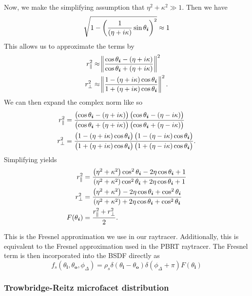 \documentclass[12pt]{article}
\begin{document}
Now, we make the simplifying assumption that \(\eta^2 + \kappa^2 \gg 1\). Then we have
\[\sqrt{1 - \del{\frac{1}{\del{\eta + i\kappa}}\sin \theta_{\bm i}}^2} \approx 1\]
This allows us to approximate the terms by
\begin{align*}
  r_{\parallel}^2 &\approx \norm{\frac{\cos \theta_{\bm i} - \del{\eta + i\kappa}}{\cos \theta_{\bm i} + \del{\eta + i\kappa}}}^2\\
  r_{\perp}^2 &\approx \norm{\frac{1 - \del{\eta + i\kappa}\cos \theta_{\bm i}}{1 + \del{\eta + i\kappa} \cos \theta_{\bm i}}}^2.
\end{align*}
We can then expand the complex norm like so
\begin{align*}
  r_{\parallel}^2 &= \frac{\del{\cos \theta_{\bm i} - \del{\eta + i\kappa}}\del{\cos \theta_{\bm i} - \del{\eta - i\kappa}}}{\del{\cos \theta_{\bm i} + \del{\eta + i\kappa}}\del{\cos \theta_{\bm i} + \del{\eta - i\kappa}}}\\
  r_{\perp}^2 &= \frac{\del{1 - \del{\eta + i\kappa}\cos \theta_{\bm i}}\del{1 - \del{\eta - i\kappa}\cos \theta_{\bm i}}}{\del{1 + \del{\eta + i\kappa} \cos \theta_{\bm i}}\del{1 + \del{\eta - i\kappa} \cos \theta_{\bm i}}}.
\end{align*}
Simplifying yields
\begin{align*}
  r_{\parallel}^2 &= \frac{\del{\eta^2 + \kappa^2}\cos^2 \theta_{\bm i} - 2\eta \cos \theta_{\bm i} + 1}{\del{\eta^2 + \kappa^2}\cos^2 \theta_{\bm i} + 2\eta \cos \theta_{\bm i} + 1}\\
  r_{\perp}^2 &= \frac{\del{\eta^2 + \kappa^2} - 2\eta \cos \theta_{\bm i} + \cos^2 \theta_{\bm i}}{\del{\eta^2 + \kappa^2} + 2\eta \cos \theta_{\bm i} + \cos^2 \theta_{\bm i}}\\
  F(\theta_{\bm i}) &= \frac{r_{\parallel}^2 + r_{\perp}^2}{2}.
\end{align*}

This is the Fresnel approximation we use in our raytracer.
Additionally, this is equivalent to the Fresnel approximation used in the PBRT raytracer.
The Fresnel term is then incorporated into the BSDF directly as
\[f_s(\theta_{\bm i}, \theta_{\bm o}, \phi_\Delta) = \rho_s \delta(\theta_{\bm i} - \theta_{\bm o})\delta(\phi_\Delta + \pi)F(\theta_{\bm i})\]

\subsubsection{Trowbridge-Reitz microfacet distribution}
\end{document}
